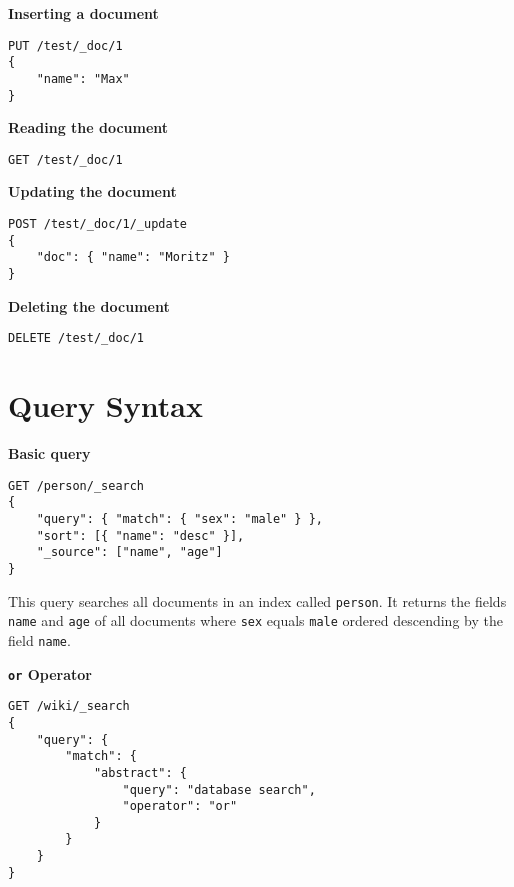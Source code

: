 \begin{minipage}[c]{0.95\textwidth}
    \textbf{Inserting a document}
    \begin{lstlisting}
PUT /test/_doc/1
{
    "name": "Max"
}
    \end{lstlisting}
\end{minipage}

\begin{minipage}[c]{0.95\textwidth}
    \textbf{Reading the document}
    \begin{lstlisting}
GET /test/_doc/1
    \end{lstlisting}
\end{minipage}

\begin{minipage}[c]{0.95\textwidth}
    \textbf{Updating the document}
    \begin{lstlisting}
POST /test/_doc/1/_update
{
    "doc": { "name": "Moritz" }
}
    \end{lstlisting}
\end{minipage}

\begin{minipage}[c]{0.95\textwidth}
    \textbf{Deleting the document}
    \begin{lstlisting}
DELETE /test/_doc/1
    \end{lstlisting}
\end{minipage}


\section{Query Syntax}

\begin{minipage}[c]{0.95\textwidth}
    \textbf{Basic query}
    \begin{lstlisting}
GET /person/_search
{
    "query": { "match": { "sex": "male" } },
    "sort": [{ "name": "desc" }],
    "_source": ["name", "age"]
}
    \end{lstlisting}
\end{minipage}

This query searches all documents in an index called \texttt{person}. It returns the fields \texttt{name} and \texttt{age} of all documents where \texttt{sex} equals \texttt{male} ordered descending by the field \texttt{name}.

\bigskip

\begin{minipage}[c]{0.95\textwidth}
    \textbf{\texttt{or} Operator}
    \begin{lstlisting}
GET /wiki/_search
{
    "query": {
        "match": {
            "abstract": {
                "query": "database search",
                "operator": "or"
            }
        }
    }
}
    \end{lstlisting}
\end{minipage}

